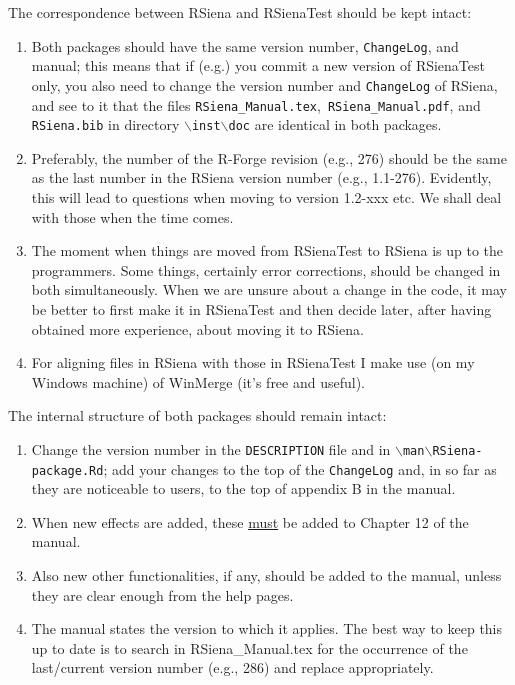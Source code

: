 \documentclass[12pt, a4paper]{article}
\renewcommand{\=}{\,=\,}
\newcommand{\+}{\,+\,}
\newcommand{\bs}{\backslash}
\newcommand{\rs}{{\sf RSiena}}
\newcommand{\RS}{{\sf RSiena }}
\newcommand{\RST}{{\sf RSienaTest }}
\begin{document}
The correspondence between \RS and \RST should be kept intact:
\begin{enumerate}
\item Both packages should have the same version number, \texttt{ChangeLog}, and
     manual; this means that if (e.g.) you commit a new version of \RST only,
     you also need to change the version number and \texttt{ChangeLog} of \rs,
     and see to it that the files \texttt{RSiena\_Manual.tex},\ \texttt{RSiena\_Manual.pdf},
     and \texttt{RSiena.bib} in directory \texttt{$\bs$inst$\bs$doc} are identical
     in both packages.
\item Preferably, the number of the R-Forge revision (e.g., 276) should
     be the same as the last number in the \RS version number (e.g., 1.1-276).
     Evidently, this will lead to questions when moving to version 1.2-xxx etc.
     We shall deal with those when the time comes.
\item The moment when things are moved from \RST to \RS is up to the programmers.
     Some things, certainly error corrections, should be changed in both simultaneously.
     When we are unsure about a change in the code, it may be better to first
     make it in \RST and then decide later, after having obtained more experience,
     about moving it to \rs.
\item For aligning files in \RS with those in \RST I make use (on my Windows machine)
     of WinMerge (it's free and useful).
\end{enumerate}

The internal structure of both packages should remain intact:
\begin{enumerate}
\item Change the version number in the \texttt{DESCRIPTION} file and in
      \texttt{$\bs$man$\bs$RSiena-package.Rd};
      add your changes to the top of the \texttt{ChangeLog} and,
      in so far as they are noticeable
      to users, to the top of appendix B in the manual.
\item When new effects are added, these \underline{must} be added to
      Chapter 12 of the manual.
\item Also new other functionalities, if any, should be added to the manual,
      unless they are clear enough from the help pages.
\item The manual states the version to which it applies. The best way to keep
      this up to date is to search in RSiena\_Manual.tex for the occurrence of the
      last/current version number (e.g., 286) and replace appropriately.
\end{enumerate}
\end{document}
